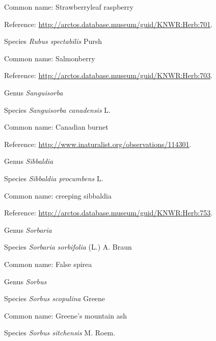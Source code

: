 \documentclass[9pt, article]{memoir}
\begin{document}
\begin{multicols}{2}
Common name: Strawberryleaf raspberry

Reference: 
\url{http://arctos.database.museum/guid/KNWR:Herb:701}.

\vspace{6pt}\noindent\hspace{36pt}Species \textit{Rubus spectabilis} Pursh


Common name: Salmonberry

Reference: 
\url{http://arctos.database.museum/guid/KNWR:Herb:703}.

\vspace{6pt}\noindent\hspace{30pt}Genus \textit{Sanguisorba}


\vspace{6pt}\noindent\hspace{36pt}Species \textit{Sanguisorba canadensis} L.


Common name: Canadian burnet

Reference: 
\url{http://www.inaturalist.org/observations/114301}.

\vspace{6pt}\noindent\hspace{30pt}Genus \textit{Sibbaldia}


\vspace{6pt}\noindent\hspace{36pt}Species \textit{Sibbaldia procumbens} L.


Common name: creeping sibbaldia

Reference: 
\url{http://arctos.database.museum/guid/KNWR:Herb:753}.

\vspace{6pt}\noindent\hspace{30pt}Genus \textit{Sorbaria}


\vspace{6pt}\noindent\hspace{36pt}Species \textit{Sorbaria sorbifolia} (L.) A. Braun


Common name: False spirea

\vspace{6pt}\noindent\hspace{30pt}Genus \textit{Sorbus}


\vspace{6pt}\noindent\hspace{36pt}Species \textit{Sorbus scopulina} Greene


Common name: Greene's mountain ash

\vspace{6pt}\noindent\hspace{36pt}Species \textit{Sorbus sitchensis} M. Roem.



\end{multicols}
\end{document}
